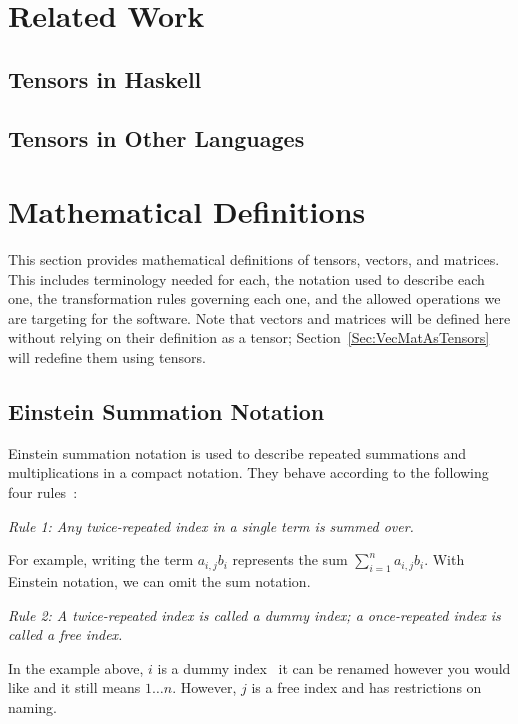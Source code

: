 \documentclass[12pt]{article}
\begin{document}
\section{Related Work}\label{Sec:RelatedWork}

\subsection{Tensors in Haskell}

\subsection{Tensors in Other Languages}

\section{Mathematical Definitions}\label{Sec:MathematicalDefinitions}
This section provides mathematical definitions of tensors, vectors, and matrices.
This includes terminology needed for each, the notation used to describe each one,
the transformation rules governing each one, and the allowed operations we are 
targeting for the software. Note that vectors and matrices will be defined here without
relying on their definition as a tensor; Section~\ref{Sec:VecMatAsTensors} will redefine
them using tensors.

\subsection{Einstein Summation Notation}

Einstein summation notation is used to describe repeated summations and multiplications
in a compact notation. They behave according to the following four rules~\citep{Khan2023}:

\medskip
\noindent\textit{Rule 1: Any twice-repeated index in a single term is summed over.}

\noindent For example, writing the term $a_{i,j}b_i$ represents the sum 
$\sum_{i=1}^n a_{i,j}b_i$. With Einstein notation, we can omit the sum notation.

\medskip
\noindent\textit{Rule 2: A twice-repeated index is called a dummy index; a 
once-repeated index is called a free index.}

\noindent In the example above, $i$ is a dummy index \textemdash~it can be renamed
however you would like and it still means $1\ldots n$. However, $j$ is a free index
and has restrictions on naming.
\end{document}
